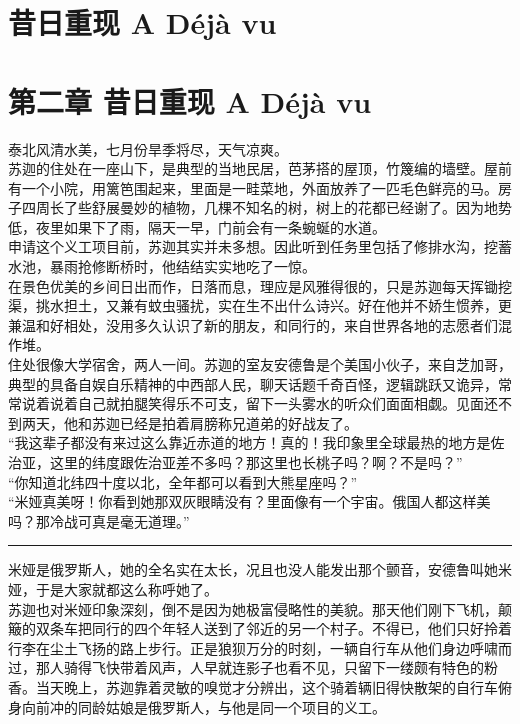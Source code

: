 \documentclass[oneside,11pt]{memoir} %
\begin{document}
\begin{CJK}{UTF8}{gbsn}
\chapter{昔日重现    A Déjà vu}
\newpage
\chapter*{第二章    昔日重现    A Déjà vu}
    泰北风清水美，七月份旱季将尽，天气凉爽。\\\indent
    苏迦的住处在一座山下，是典型的当地民居，芭茅搭的屋顶，竹篾编的墙壁。屋前有一个小院，用篱笆围起来，里面是一畦菜地，外面放养了一匹毛色鲜亮的马。房子四周长了些舒展曼妙的植物，几棵不知名的树，树上的花都已经谢了。因为地势低，夜里如果下了雨，隔天一早，门前会有一条蜿蜒的水道。\\\indent
    申请这个义工项目前，苏迦其实并未多想。因此听到任务里包括了修排水沟，挖蓄水池，暴雨抢修断桥时，他结结实实地吃了一惊。\\\indent
    在景色优美的乡间日出而作，日落而息，理应是风雅得很的，只是苏迦每天挥锄挖渠，挑水担土，又兼有蚊虫骚扰，实在生不出什么诗兴。好在他并不娇生惯养，更兼温和好相处，没用多久认识了新的朋友，和同行的，来自世界各地的志愿者们混作堆。\\\indent
    住处很像大学宿舍，两人一间。苏迦的室友安德鲁是个美国小伙子，来自芝加哥，典型的具备自娱自乐精神的中西部人民，聊天话题千奇百怪，逻辑跳跃又诡异，常常说着说着自己就拍腿笑得乐不可支，留下一头雾水的听众们面面相觑。见面还不到两天，他和苏迦已经是拍着肩膀称兄道弟的好战友了。\\\indent
    “我这辈子都没有来过这么靠近赤道的地方！真的！我印象里全球最热的地方是佐治亚，这里的纬度跟佐治亚差不多吗？那这里也长桃子吗？啊？不是吗？”\\\indent
   “你知道北纬四十度以北，全年都可以看到大熊星座吗？”\\\indent
   “米娅真美呀！你看到她那双灰眼睛没有？里面像有一个宇宙。俄国人都这样美吗？那冷战可真是毫无道理。”\\\indent
\rule{-3pt}{30pt} 
   米娅是俄罗斯人，她的全名实在太长，况且也没人能发出那个颤音，安德鲁叫她米娅，于是大家就都这么称呼她了。\\\indent
   苏迦也对米娅印象深刻，倒不是因为她极富侵略性的美貌。那天他们刚下飞机，颠簸的双条车把同行的四个年轻人送到了邻近的另一个村子。不得已，他们只好拎着行李在尘土飞扬的路上步行。正是狼狈万分的时刻，一辆自行车从他们身边呼啸而过，那人骑得飞快带着风声，人早就连影子也看不见，只留下一缕颇有特色的粉香。当天晚上，苏迦靠着灵敏的嗅觉才分辨出，这个骑着辆旧得快散架的自行车俯身向前冲的同龄姑娘是俄罗斯人，与他是同一个项目的义工。\\\indent

\end{CJK}
\end{document}
